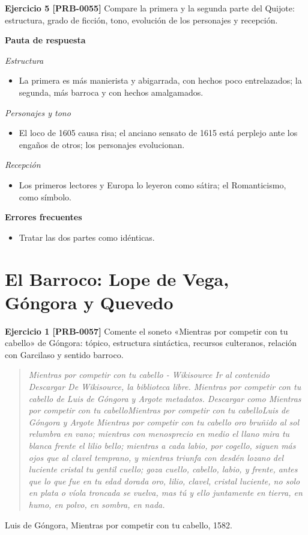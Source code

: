 \documentclass{book}
\begin{document}
\noindent\textbf{Ejercicio 5 [PRB-0055]}
Compare la primera y la segunda parte del Quijote: estructura, grado de ficción, tono, evolución de los personajes y recepción.


\noindent\textbf{Pauta de respuesta}

\noindent\textit{Estructura}
\begin{itemize}
\item La primera es más manierista y abigarrada, con hechos poco entrelazados; la segunda, más barroca y con hechos amalgamados.
\end{itemize}

\noindent\textit{Personajes y tono}
\begin{itemize}
\item El loco de 1605 causa risa; el anciano sensato de 1615 está perplejo ante los engaños de otros; los personajes evolucionan.
\end{itemize}

\noindent\textit{Recepción}
\begin{itemize}
\item Los primeros lectores y Europa lo leyeron como sátira; el Romanticismo, como símbolo.
\end{itemize}

\noindent\textbf{Errores frecuentes}
\begin{itemize}
\item Tratar las dos partes como idénticas.
\end{itemize}

\section{El Barroco: Lope de Vega, Góngora y Quevedo}

\noindent\textbf{Ejercicio 1 [PRB-0057]}
Comente el soneto «Mientras por competir con tu cabello» de Góngora: tópico, estructura sintáctica, recursos culteranos, relación con Garcilaso y sentido barroco.


\begin{quote}
\itshape Mientras por competir con tu cabello - Wikisource Ir al contenido Descargar De Wikisource, la biblioteca libre. Mientras por competir con tu cabello de Luis de Góngora y Argote metadatos. Descargar como Mientras por competir con tu cabelloMientras por competir con tu cabelloLuis de Góngora y Argote Mientras por competir con tu cabello oro bruñido al sol relumbra en vano; mientras con menosprecio en medio el llano mira tu blanca frente el lilio bello; mientras a cada labio, por cogello, siguen más ojos que al clavel temprano, y mientras triunfa con desdén lozano del luciente cristal tu gentil cuello; goza cuello, cabello, labio, y frente, antes que lo que fue en tu edad dorada oro, lilio, clavel, cristal luciente, no solo en plata o víola troncada se vuelva, mas tú y ello juntamente en tierra, en humo, en polvo, en sombra, en nada.
\end{quote}
{\noindent\footnotesize Luis de Góngora, Mientras por competir con tu cabello, 1582.\par}
\end{document}
